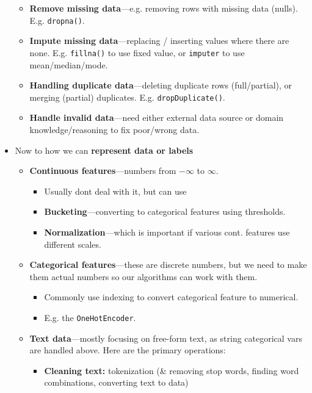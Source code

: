 \begin{itemize}
  \begin{itemize}
    \item
    \textbf{Remove missing data}---e.g. removing rows with missing data
    (nulls). E.g. \texttt{dropna()}.
  \item
    \textbf{Impute missing data}---replacing / inserting values where
    there are none. E.g. \texttt{fillna()} to use fixed value, or
    \texttt{imputer} to use mean/median/mode.
  \item
    \textbf{Handling duplicate data}---deleting duplicate rows
    (full/partial), or merging (partial) duplicates. E.g.
    \texttt{dropDuplicate()}.
  \item
    \textbf{Handle invalid data}---need either external data source or
    domain knowledge/reasoning to fix poor/wrong data.
  \end{itemize}
\item
  Now to how we can \textbf{represent data or labels}

  \begin{itemize}
    \item
    \textbf{Continuous features}---numbers from {\(- \infty\)} to
    {\(\infty\)}.

    \begin{itemize}
        \item
      Usually don\textquotesingle t deal with it, but can use
    \item
      \textbf{Bucketing}---converting to categorical features using
      thresholds.
    \item
      \textbf{Normalization}---which is important if various cont.
      features use different scales.
    \end{itemize}
  \item
    \textbf{Categorical features}---these are discrete numbers, but we
    need to make them actual numbers so our algorithms can work with
    them.

    \begin{itemize}
        \item
      Commonly use indexing to convert categorical feature to numerical.
    \item
      E.g. the \texttt{OneHotEncoder}.
    \end{itemize}
  \item
    \textbf{Text data}---mostly focusing on free-form text, as string
    categorical vars are handled above. Here are the primary operations:

    \begin{itemize}
        \item
      \textbf{Cleaning text:} tokenization (\& removing stop words,
      finding word combinations, converting text to data)


\end{itemize}
\end{itemize}
\end{itemize}
